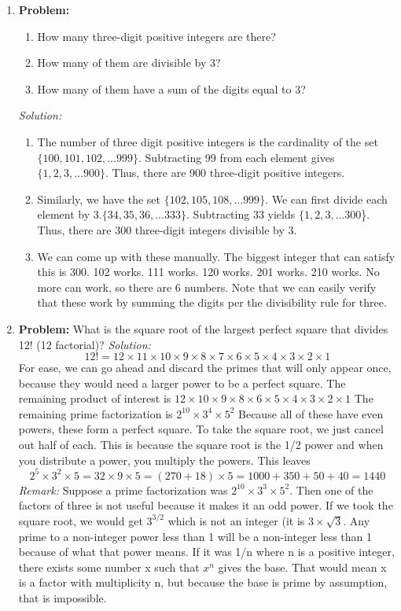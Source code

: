 \documentclass{article}
\begin{document}
\begin{enumerate}
    \item \textbf{Problem:}
     \begin{enumerate}
        \item How many three-digit positive integers are there?
        \item How many of them are divisible by 3?
        \item How many of them have a sum of the digits equal to 3?
    \end{enumerate}
    \textit{Solution:} \begin{enumerate}
        \item The number of three digit positive integers is the cardinality of the set $\{100,101,102,\ldots999\}$. Subtracting 99 from each element gives $\{1,2,3,\ldots900\}$. Thus, there are 900 three-digit positive integers.
        \item Similarly, we have the set $\{102,105,108,\ldots999\}$. We can first divide each element by 3.$\{34,35,36, \ldots333\}$. Subtracting 33 yields $\{1,2,3,\ldots300$\}. Thus, there are 300 three-digit integers divisible by 3.
        \item We can come up with these manually. The biggest integer that can satisfy this is 300. 102 works. 111 works. 120 works. 201 works. 210 works. No more can work, so there are 6 numbers. Note that we can easily verify that these work by summing the digits per the divisibility rule for three.
    \end{enumerate}
    \item \textbf{Problem:}
    What is the square root of the largest perfect square that divides 12! (12 factorial)?
    \textit{Solution:}
    $$12! = 12\times11\times10\times9\times8\times7\times6\times5\times4\times3\times2\times1$$
    For ease, we can go ahead and discard the primes that will only appear once, because they would need a larger power to be a perfect square.
    The remaining product of interest is $12\times10\times9\times8\times6\times5\times4\times3\times2\times1$
    The remaining prime factorization is $2^{10}\times3^{4}\times5^{2}$
    Because all of these have even powers, these form a perfect square.
    To take the square root, we just cancel out half of each. This is because the square root is the 1/2 power and when you distribute a power, you multiply the powers.  This leaves $$2^{5}\times3^{2}\times5 = 32\times9\times5 = (270+18)\times5 = 1000+350+50+40 = 1440$$
    \textit{Remark:} Suppose a prime factorization was $2^{10}\times3^{3}\times5^{2}$. Then one of the factors of three is not useful because it makes it an odd power. If we took the square root, we would get $3^{3/2}$ which is not an integer (it is $3\times\sqrt{3}$. Any prime to a non-integer power less than 1 will be a non-integer less than 1 because of what that power means. If it was 1/n where n is a positive integer, there exists some number x such that $x^{n}$ gives the base. That would mean x is a factor with multiplicity n, but because the base is prime by assumption, that is impossible.

\end{enumerate}
\end{document}
